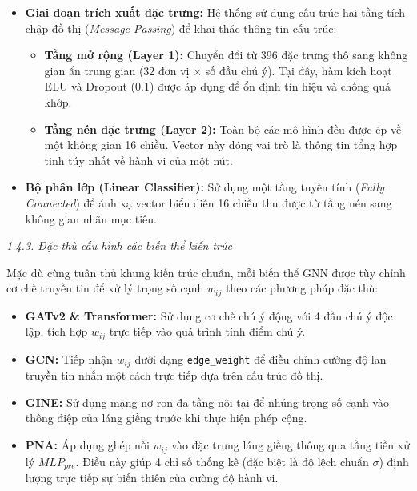 \begin{itemize}[label={--}, itemsep=1pt]
    \item \textbf{Giai đoạn trích xuất đặc trưng:} Hệ thống sử dụng cấu trúc hai tầng tích chập đồ thị (\textit{Message Passing}) để khai thác thông tin cấu trúc:
    \begin{itemize}[label={+}, itemsep=1pt]
        \item \textbf{Tầng mở rộng (Layer 1):} Chuyển đổi từ 396 đặc trưng thô sang không gian ẩn trung gian (32 đơn vị × số đầu chú ý). Tại đây, hàm kích hoạt ELU và Dropout (0.1) được áp dụng để ổn định tín hiệu và chống quá khớp.
        \item \textbf{Tầng nén đặc trưng (Layer 2):} Toàn bộ các mô hình đều được ép về một không gian 16 chiều. Vector này đóng vai trò là thông tin tổng hợp tinh túy nhất về hành vi của một nút.
    \end{itemize}
    \item \textbf{Bộ phân lớp (Linear Classifier):} Sử dụng một tầng tuyến tính (\textit{Fully Connected}) để ánh xạ vector biểu diễn 16 chiều thu được từ tầng nén sang không gian nhãn mục tiêu.
\end{itemize}

\textit{1.4.3. Đặc thù cấu hình các biến thể kiến trúc}\vspace{0.2cm}

\indent Mặc dù cùng tuân thủ khung kiến trúc chuẩn, mỗi biến thể GNN được tùy chỉnh cơ chế truyền tin để xử lý trọng số cạnh $w_{ij}$ theo các phương pháp đặc thù:
\begin{itemize}[label={--}, itemsep=1pt]
    \item \textbf{GATv2 \& Transformer:} Sử dụng cơ chế chú ý động với 4 đầu chú ý độc lập, tích hợp $w_{ij}$ trực tiếp vào quá trình tính điểm chú ý.
    \item \textbf{GCN:} Tiếp nhận $w_{ij}$ dưới dạng \texttt{edge\_weight} để điều chỉnh cường độ lan truyền tin nhắn một cách trực tiếp dựa trên cấu trúc đồ thị.
    \item \textbf{GINE:} Sử dụng mạng nơ-ron đa tầng nội tại để nhúng trọng số cạnh vào thông điệp của láng giềng trước khi thực hiện phép cộng.
    \item \textbf{PNA:} Áp dụng ghép nối $w_{ij}$ vào đặc trưng láng giềng thông qua tầng tiền xử lý $MLP_{pre}$. Điều này giúp 4 chỉ số thống kê (đặc biệt là độ lệch chuẩn $\sigma$) định lượng trực tiếp sự biến thiên của cường độ hành vi.
\end{itemize}